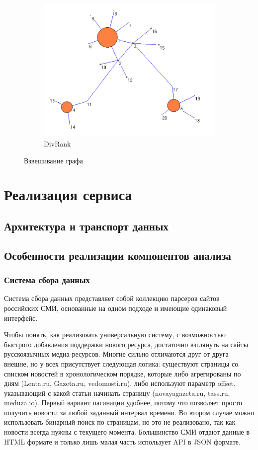 \documentclass[a4paper, 14pt]{extarticle}
\begin{document}
\begin{figure}[h]
\begin{subfigure}[b]{0.3\textwidth}
	\end{subfigure}
	~ 
	\begin{subfigure}[b]{0.3\textwidth}
		\includegraphics[width=\textwidth]{DivR}
		\caption{DivRank}
	\end{subfigure}
	\caption{Взвешивание графа}
	\label{div}
\end{figure}


\section{Реализация сервиса}
\subsection{Архитектура и транспорт данных}
\subsection{Особенности реализации компонентов анализа}
\subsubsection{Система сбора данных}

Система сбора данных представляет собой коллекцию парсеров сайтов российских СМИ, основанные на одном подходе и имеющие одинаковый интерфейс.

Чтобы понять, как реализовать универсальную систему, с возможностью быстрого добавления поддержки нового ресурса, достаточно взглянуть на сайты русскоязычных медиа-ресурсов. Многие сильно отличаются друг от друга внешне, но у всех присутствует следующая логика: существуют страницы со списком новостей в хронологическом порядке, которые либо агрегированы по дням (Lenta.ru, Gazeta.ru, vedomosti.ru), либо используют параметр offset, указывающий с какой статьи начинать страницу (novayagazeta.ru, tass.ru, meduza.io). Первый вариант пагинации удобнее, потому что позволяет просто получить новости за любой заданный интервал времени. Во втором случае можно использовать бинарный поиск по страницам, но это не реализовано, так как новости всегда нужны с текущего момента.
Большинство СМИ отдают данные в HTML формате и только лишь малая часть использует API в JSON формате.
\end{document}
